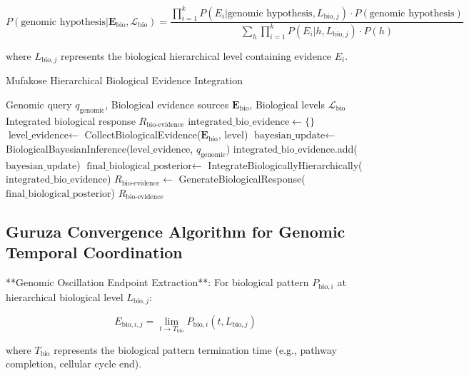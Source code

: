 \documentclass[12pt,a4paper]{article}
\begin{document}
\begin{equation}
P(\text{genomic hypothesis} | \mathbf{E}_{\text{bio}}, \mathcal{L}_{\text{bio}}) = \frac{\prod_{i=1}^{k} P(E_i | \text{genomic hypothesis}, L_{\text{bio},j}) \cdot P(\text{genomic hypothesis})}{\sum_{h} \prod_{i=1}^{k} P(E_i | h, L_{\text{bio},j}) \cdot P(h)}
\end{equation}

where $L_{\text{bio},j}$ represents the biological hierarchical level containing evidence $E_i$.

\begin{algorithm}
\caption{Mufakose Hierarchical Biological Evidence Integration}
\begin{algorithmic}[1]
\Require Genomic query $q_{\text{genomic}}$, Biological evidence sources $\mathbf{E}_{\text{bio}}$, Biological levels $\mathcal{L}_{\text{bio}}$
\Ensure Integrated biological response $R_{\text{bio-evidence}}$
\State $\text{integrated\_bio\_evidence} \leftarrow \{\}$
    \State $\text{level\_evidence} \leftarrow$ CollectBiologicalEvidence($\mathbf{E}_{\text{bio}}$, $\text{level}$)
    \State $\text{bayesian\_update} \leftarrow$ BiologicalBayesianInference($\text{level\_evidence}$, $q_{\text{genomic}}$)
    \State $\text{integrated\_bio\_evidence}$.add($\text{bayesian\_update}$)
\EndFor
\State $\text{final\_biological\_posterior} \leftarrow$ IntegrateBiologicallyHierarchically($\text{integrated\_bio\_evidence}$)
\State $R_{\text{bio-evidence}} \leftarrow$ GenerateBiologicalResponse($\text{final\_biological\_posterior}$)
\Return $R_{\text{bio-evidence}}$
\end{algorithmic}
\end{algorithm}

\subsection{Guruza Convergence Algorithm for Genomic Temporal Coordination}

**Genomic Oscillation Endpoint Extraction**: For biological pattern $P_{\text{bio},i}$ at hierarchical biological level $L_{\text{bio},j}$:

\begin{equation}
E_{\text{bio},i,j} = \lim_{t \to T_{\text{bio}}} P_{\text{bio},i}(t, L_{\text{bio},j})
\end{equation}

where $T_{\text{bio}}$ represents the biological pattern termination time (e.g., pathway completion, cellular cycle end).
\end{document}

